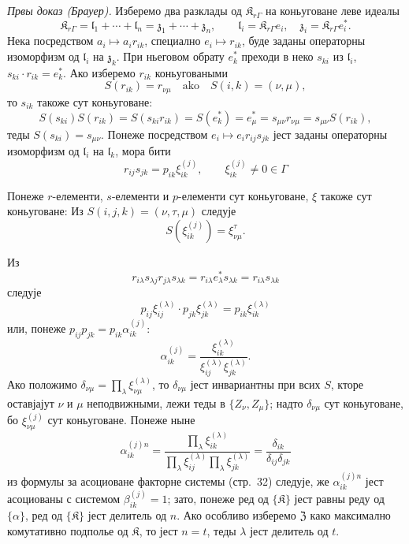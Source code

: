 \documentclass[11pt]{article}
\begin{document}
\emph{Првы доказ (Брауер).} Изберемо два разклады од \(\mathfrak K_{r\Gamma}\) на коньуговане леве идеалы
\[
\mathfrak K_{r\Gamma}=\mathfrak l_1+\cdots+\mathfrak l_n=\mathfrak z_1+\cdots+\mathfrak z_n,\qquad
\mathfrak l_i=\mathfrak K_{r\Gamma}e_i,\quad
\mathfrak z_i=\mathfrak K_{r\Gamma}e_i^*.
\]
Нека посредством \(a_i\mapsto a_ir_{ik}\), специално \(e_i\mapsto r_{ik}\), буде заданы операторны изоморфизм од \(\mathfrak l_i\) на \(\mathfrak z_k\). При ньеговом обрату \(e_k^*\) преходи в неко \(s_{ki}\) из \(\mathfrak l_i\), \(s_{ki}\cdot r_{ik}=e_k^*\). Ако изберемо \(r_{ik}\) коньуговаными
\[
S(r_{ik})=r_{\nu\mu}\quad\text{ako}\quad S(i,k)=(\nu,\mu),
\]
то \(s_{ik}\) такоже сут коньуговане:
\[
S(s_{ki})S(r_{ik})=S(s_{ki}r_{ik})=S(e_k^*)=e_\mu^*
=s_{\mu\nu}r_{\nu\mu}=s_{\mu\nu}S(r_{ik}),
\]
теды \(S(s_{ki})=s_{\mu\nu}\). Понеже посредством \(e_i\mapsto e_ir_{ij}s_{jk}\) јест заданы операторны изоморфизм од \(\mathfrak l_i\) на \(\mathfrak l_k\), мора бити
\[
r_{ij}s_{jk}=p_{ik}\xi_{ik}^{(j)},\qquad
\xi_{ik}^{(j)}\ne0\in\Gamma
\]

Понеже \(r\)-елементи, \(s\)-елементи и \(p\)-елементи сут коньуговане, \(\xi\) такоже сут коньуговане: Из \(S(i,j,k)=(\nu,\tau,\mu)\) следује
\[
S(\xi_{ik}^{(j)})=\xi_{\nu\mu}^{\tau}.
\]

Из
\[
r_{i\lambda}s_{\lambda j}r_{j\lambda}s_{\lambda k}
=r_{i\lambda}e_\lambda^*s_{\lambda k}
=r_{i\lambda}s_{\lambda k}
\]
следује
\[
p_{ij}\xi_{ij}^{(\lambda)}\cdot p_{jk}\xi_{jk}^{(\lambda)}
=p_{ik}\xi_{ik}^{(\lambda)}
\]
или, понеже \(p_{ij}p_{jk}=p_{ik}\alpha_{ik}^{(j)}\):
\[
\alpha_{ik}^{(j)}
=\frac{\xi_{ik}^{(\lambda)}}{\xi_{ij}^{(\lambda)}\xi_{jk}^{(\lambda)}}.
\]
Ако положимо \(\delta_{\nu\mu}=\prod_{\lambda}\xi_{\nu\mu}^{(\lambda)}\), то \(\delta_{\nu\mu}\) јест инвариантны при всих \(S\), кторе оставјајут \(\nu\) и \(\mu\) неподвижными, лежи теды в \(\{Z_\nu,Z_\mu\}\); надто \(\delta_{\nu\mu}\) сут коньуговане, бо \(\xi_{\nu\mu}^{(j)}\) сут коньуговане. Понеже ныне
\[
\alpha_{ik}^{(j)n}
=\frac{\prod_{\lambda}\xi_{ik}^{(\lambda)}}
       {\prod_{\lambda}\xi_{ij}^{(\lambda)}\prod_{\lambda}\xi_{jk}^{(\lambda)}}
=\frac{\delta_{ik}}{\delta_{ij}\delta_{jk}}
\]
из формулы за асоциоване факторне системы (стр.~32) следује, же \(\alpha_{ik}^{(j)n}\) јест асоциованы с системом \(\beta_{ik}^{(j)}=1\); зато, понеже ред од \(\{\mathfrak K\}\) јест равны реду од \(\{\alpha\}\), ред од \(\{\mathfrak K\}\) јест делитель од \(n\). Ако особливо изберемо \(\mathfrak Z\) како максимално комутативно подполье од \(\mathfrak K\), то јест \(n=t\), теды \(\lambda\) јест делитель од \(t\).
\end{document}
